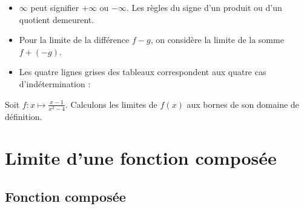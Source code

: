 \documentclass{cornouaille}
\begin{document}
\begin{remarque}
\begin{itemize}
\item $\infty$ peut signifier $+\infty$ ou $-\infty$. Les règles du signe d'un produit ou d'un quotient demeurent.
\item Pour la limite de la différence $f-g$, on considère la limite de la somme $f+(-g)$.
\item Les quatre lignes grises des tableaux correspondent aux quatre cas d'indétermination :\\
\begin{minipage}{1.1\linewidth}
\end{minipage}

\end{itemize}
\end{remarque}

\begin{exemple}
Soit $f:x\mapsto  \frac{x-1}{x^2-4}$.
Calculons les limites de $f(x)$ aux bornes de son domaine de définition.
\end{exemple}


\section{Limite d'une fonction composée}

\subsection{\textbf{Fonction composée}}
\end{document}
